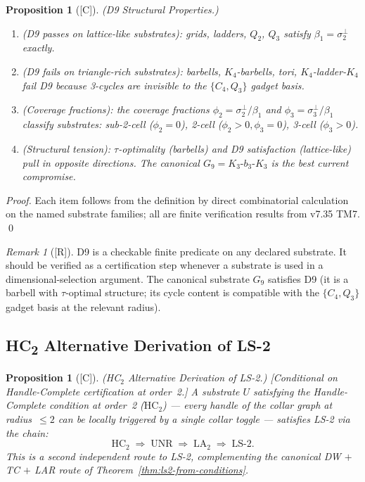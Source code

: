 \documentclass[12pt,oneside]{amsbook}
\theoremstyle{plain}
\newtheorem{proposition}[theorem]{Proposition}
\theoremstyle{definition}
\theoremstyle{remark}
\newtheorem{remark}[theorem]{Remark}
\newcommand{\status}[1]{\textup{[#1]}}
\begin{document}
\begin{proposition}[\status{C}]\label{prop:D9-structural}
\textup{(D9 Structural Properties.)}
\begin{enumerate}[label=\textup{(\arabic*)}]
  \item \textup{(D9 passes on lattice-like substrates)}: grids,
    ladders, $Q_2$, $Q_3$ satisfy $\beta_1 = \sigma^\perp_2$ exactly.
  \item \textup{(D9 fails on triangle-rich substrates)}: barbells,
    $K_4$-barbells, tori, $K_4$-ladder-$K_4$ fail D9 because
    3-cycles are invisible to the $\{C_4, Q_3\}$ gadget basis.
  \item \textup{(Coverage fractions)}: the coverage fractions
    $\phi_2 = \sigma^\perp_2 / \beta_1$ and
    $\phi_3 = \sigma^\perp_3 / \beta_1$ classify substrates:
    \emph{sub-2-cell} ($\phi_2=0$), \emph{2-cell} ($\phi_2>0, \phi_3=0$),
    \emph{3-cell} ($\phi_3>0$).
  \item \textup{(Structural tension)}: $\tau$-optimality (barbells) and
    D9 satisfaction (lattice-like) pull in opposite directions.
    The canonical $G_9 = K_3\text{-}b_3\text{-}K_3$ is the best
    current compromise.
\end{enumerate}
\end{proposition}

\begin{proof}
Each item follows from the definition by direct combinatorial
calculation on the named substrate families; all are finite
verification results from v7.35 TM7. \qed
\end{proof}

\begin{remark}[\status{R}]
D9 is a checkable finite predicate on any declared substrate.
It should be verified as a certification step whenever a
substrate is used in a dimensional-selection argument.
The canonical substrate $G_9$ satisfies D9 (it is a barbell
with $\tau$-optimal structure; its cycle content is compatible
with the $\{C_4, Q_3\}$ gadget basis at the relevant radius).
\end{remark}

\subsection{HC\textsubscript{2} Alternative Derivation of LS-2}

\begin{proposition}[\status{C}]\label{prop:HC2-ls2}
\textup{(HC$_2$ Alternative Derivation of LS-2.)}
\textup{[Conditional on Handle-Complete certification at order~2.]}
A substrate $U$ satisfying the Handle-Complete condition at order~2
($\mathrm{HC}_2$) --- every handle of the collar graph at radius~$\leq 2$
can be locally triggered by a single collar toggle ---
satisfies LS-2 via the chain:
\[
  \mathrm{HC}_2 \;\Rightarrow\; \mathrm{UNR}
  \;\Rightarrow\; \mathrm{LA}_2
  \;\Rightarrow\; \mathrm{LS}\text{-}2.
\]
This is a second independent route to LS-2, complementing the
canonical DW $+$ TC $+$ LAR route of
Theorem~\ref{thm:ls2-from-conditions}.
\end{proposition}
\end{document}
